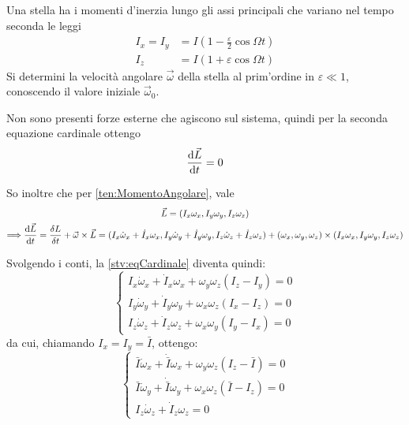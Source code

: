 \documentclass[../main.tex]{subfiles}
\begin{document}
\textex
Una stella ha i momenti d'inerzia lungo gli assi principali che variano nel tempo seconda le leggi
\begin{align*}
	I_x=I_y & =I\left(1-\frac \varepsilon 2\cos\Omega t\right)\\
	I_z & = I\left(1+\varepsilon \cos\Omega t\right)
\end{align*}
Si determini la velocità angolare $\vec\omega$ della stella al prim'ordine in $\varepsilon\ll 1$, conoscendo il valore iniziale $\vec\omega_0$.

\solution
Non sono presenti forze esterne che agiscono sul sistema, quindi per la seconda equazione cardinale ottengo
\begin{equation}\label{stv:eqCardinale}
	\frac{\mathrm{d} \vec L}{\mathrm{d} t}=0
\end{equation}

So inoltre che per \cref{ten:MomentoAngolare}, vale
\begin{gather*}
	\vec L = (I_x\omega_x,I_y\omega_y,I_z\omega_z)\\
	\Longrightarrow \frac{\mathrm{d} \vec L}{\mathrm{d} t}=\frac{\delta L}{\delta t}+\vec\omega\times \vec L = (I_x\dot\omega_x+\dot I_x\omega_x,I_y\dot \omega_y+\dot I_y\omega_y,I_z\dot\omega_z+\dot I_z\omega_z)+(\omega_x,\omega_y,\omega_z)\times (I_x\omega_x,I_y\omega_y,I_z\omega_z)
\end{gather*}

Svolgendo i conti, la \cref{stv:eqCardinale} diventa quindi:
\begin{equation*}
\begin{cases}
	I_x\dot\omega_x+\dot I_x\omega_x+\omega_y\omega_z(I_z-I_y)=0\\
	I_y\dot\omega_y+\dot I_y\omega_y+\omega_x\omega_z(I_x-I_z)=0\\
	I_z\dot\omega_z+\dot I_z\omega_z+\omega_x\omega_y(I_y-I_x)=0
\end{cases}
\end{equation*}
da cui, chiamando $I_x=I_y=\bar I$, ottengo:
\begin{equation}\label{stv:sistemaEq}
\begin{cases}
	\bar I\dot\omega_x+\dot {\bar I}\omega_x+\omega_y\omega_z(I_z-\bar I)=0\\
	\bar I\dot\omega_y+\dot {\bar I} \omega_y+\omega_x\omega_z(\bar I-I_z)=0\\
	I_z\dot\omega_z+\dot I_z\omega_z=0
\end{cases}
\end{equation}
\end{document}
